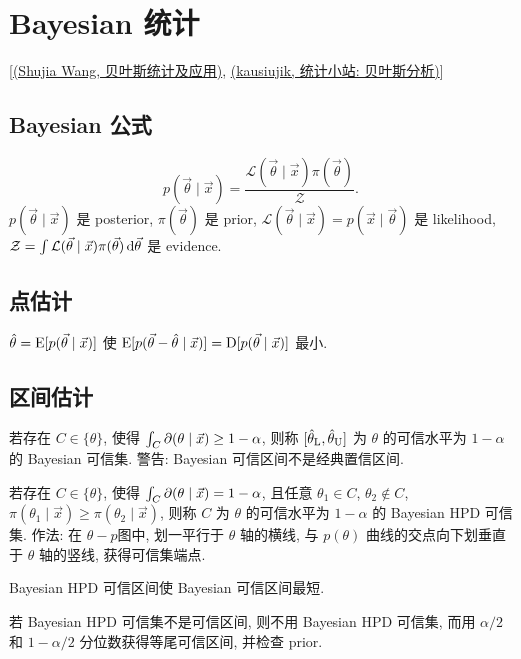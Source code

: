 \chapter{Bayesian 统计}

[\href{https://andrewwang.rbind.io/courses/bayesian_statistics/}{(Shujia Wang, 贝叶斯统计及应用)}, \href{https://andrewwang.rbind.io/courses/bayesian_statistics/}{(kausiujik, 统计小站: 贝叶斯分析)}]

\section{Bayesian 公式}

\begin{equation}
    p(\vec{\theta}\mid \vec{x})=\frac{\mathcal{L}(\vec{\theta}\mid \vec{x})\pi(\vec{\theta})}{\mathcal{Z}}.
\end{equation}
$p(\vec{\theta}\mid \vec{x})$ 是 posterior, $\pi(\vec{\theta})$ 是 prior, $\mathcal{L}(\vec{\theta}\mid \vec{x})=p(\vec{x}\mid \vec{\theta})$ 是 likelihood, $\mathcal{Z}=\int\mathcal{L}(\vec{\theta}\mid \vec{x})\pi(\vec{\theta})\,\mathrm{d}\vec{\theta}$ 是 evidence.

\section{点估计}

$\hat{\theta}=\text{E}[p(\vec{\theta}\mid \vec{x})]$ 使 $\text{E}[p(\vec{\theta}-\hat{\theta}\mid \vec{x})]=\text{D}[p(\vec{\theta}\mid \vec{x})]$ 最小.

\section{区间估计}

若存在 $C\in\{\theta\}$, 使得 $\int_{C}\partial(\theta\mid \vec{x})\ge1-\alpha$, 则称 $[\hat{\theta}_\text{L},\hat{\theta}_\text{U}]$ 为 $\theta$ 的可信水平为 $1-\alpha$ 的 Bayesian 可信集. 警告: Bayesian 可信区间不是经典置信区间.

若存在 $C\in\{\theta\}$, 使得 $\int_{C}\partial(\theta\mid \vec{x})=1-\alpha$, 且任意 $\theta_1\in C$, $\theta_2\notin C$, $\pi(\theta_1\mid \vec{x})\ge\pi(\theta_2\mid \vec{x})$, 则称 $C$ 为 $\theta$ 的可信水平为 $1-\alpha$ 的 Bayesian HPD 可信集. 作法: 在 $\theta-p$图中, 划一平行于 $\theta$ 轴的横线, 与 $p(\theta)$ 曲线的交点向下划垂直于 $\theta$ 轴的竖线, 获得可信集端点.

Bayesian HPD 可信区间使 Bayesian 可信区间最短.

若 Bayesian HPD 可信集不是可信区间, 则不用 Bayesian HPD 可信集, 而用 $\alpha/2$ 和 $1-\alpha/2$ 分位数获得等尾可信区间, 并检查 prior.

